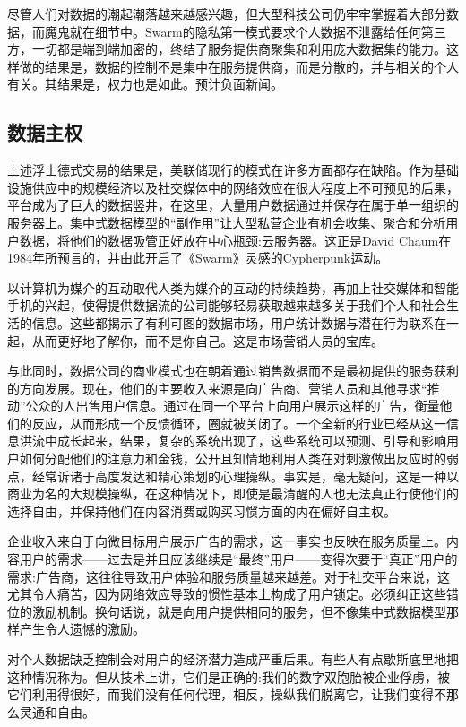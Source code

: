 尽管人们对数据的潮起潮落越来越感兴趣，但大型科技公司仍牢牢掌握着大部分数据，而魔鬼就在细节中。Swarm的隐私第一模式要求个人数据不泄露给任何第三方，一切都是端到端加密的，终结了服务提供商聚集和利用庞大数据集的能力。这样做的结果是，数据的控制不是集中在服务提供商，而是分散的，并与相关的个人有关。其结果是，权力也是如此。预计负面新闻。

\subsection{数据主权 }\label{sec:data-sovereignty}

上述浮士德式交易的结果是，美联储现行的模式在许多方面都存在缺陷。作为基础设施供应中的规模经济以及社交媒体中的网络效应在很大程度上不可预见的后果，平台成为了巨大的数据竖井，在这里，大量用户数据通过并保存在属于单一组织的服务器上。集中式数据模型的“副作用”让大型私营企业有机会收集、聚合和分析用户数据，将他们的数据吸管正好放在中心瓶颈:云服务器。这正是David Chaum在1984年所预言的，并由此开启了《Swarm》灵感的Cypherpunk运动。

以计算机为媒介的互动取代人类为媒介的互动的持续趋势，再加上社交媒体和智能手机的兴起，使得提供数据流的公司能够轻易获取越来越多关于我们个人和社会生活的信息。这些都揭示了有利可图的数据市场，用户统计数据与潜在行为联系在一起，从而更好地了解你，而不是你自己。这是市场营销人员的宝库。

与此同时，数据公司的商业模式也在朝着通过销售数据而不是最初提供的服务获利的方向发展。现在，他们的主要收入来源是向广告商、营销人员和其他寻求“推动”公众的人出售用户信息。通过在同一个平台上向用户展示这样的广告，衡量他们的反应，从而形成一个反馈循环，圈就被关闭了。一个全新的行业已经从这一信息洪流中成长起来，结果，复杂的系统出现了，这些系统可以预测、引导和影响用户如何分配他们的注意力和金钱，公开且知情地利用人类在对刺激做出反应时的弱点，经常诉诸于高度发达和精心策划的心理操纵。事实是，毫无疑问，这是一种以商业为名的大规模操纵，在这种情况下，即使是最清醒的人也无法真正行使他们的选择自由，并保持他们在内容消费或购买习惯方面的内在偏好自主权。

企业收入来自于向微目标用户展示广告的需求，这一事实也反映在服务质量上。内容用户的需求——过去是并且应该继续是“最终”用户——变得次要于“真正”用户的需求:广告商，这往往导致用户体验和服务质量越来越差。对于社交平台来说，这尤其令人痛苦，因为网络效应导致的惯性基本上构成了用户锁定。必须纠正这些错位的激励机制。换句话说，就是向用户提供相同的服务，但不像集中式数据模型那样产生令人遗憾的激励。

对个人数据缺乏控制会对用户的经济潜力造成严重后果。有些人有点歇斯底里地把这种情况称为。但从技术上讲，它们是正确的:我们的数字双胞胎被企业俘虏，被它们利用得很好，而我们没有任何代理，相反，操纵我们脱离它，让我们变得不那么灵通和自由。 


